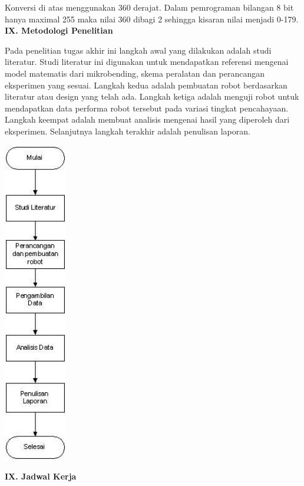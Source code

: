 \documentclass[a4paper,12pt]{article}
\begin{document}
Konversi di atas menggunakan 360 derajat.
Dalam pemrograman bilangan 8 bit hanya maximal 255 maka nilai 360 dibagi 2 sehingga kisaran nilai menjadi 0-179.
\\[10pt]
\noindent \textbf{IX. \hspace{9pt} Metodologi Penelitian} 

Pada penelitian tugas akhir ini langkah awal yang dilakukan adalah studi literatur.
Studi literatur ini digunakan untuk mendapatkan referensi mengenai model matematis dari mikrobending, skema peralatan dan perancangan eksperimen yang sesuai.
Langkah kedua adalah pembuatan robot berdasarkan literatur atau design yang telah ada.
Langkah ketiga adalah menguji robot untuk mendapatkan data performa robot tersebut pada variasi tingkat pencahayaan.
Langkah keempat adalah membuat analisis mengenai hasil yang diperoleh dari eksperimen. 
Selanjutnya langkah terakhir adalah penulisan laporan.

\begin{center}
 \includegraphics[height=400pt]{flow}
\end{center}

\vspace{10pt}
\noindent \textbf{IX. \hspace{9pt} Jadwal Kerja} 
\end{document}
